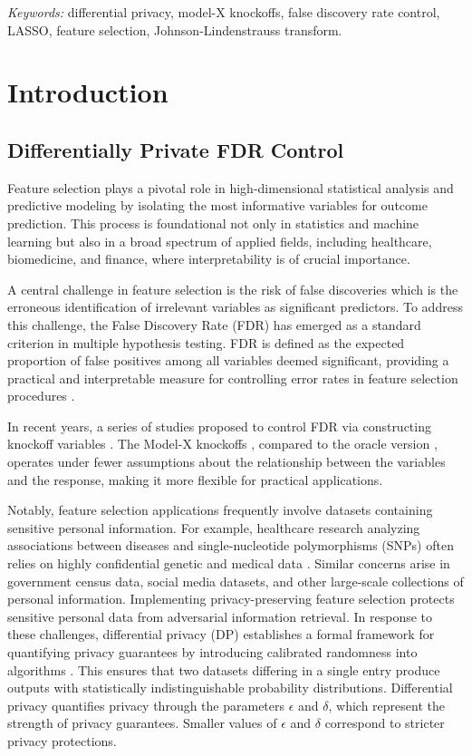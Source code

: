 \documentclass[11pt]{article}
\begin{document}
\noindent \emph{Keywords:} differential privacy, model-X knockoffs, false discovery rate control, LASSO, feature selection, Johnson-Lindenstrauss transform. 


\section{Introduction}
\subsection{Differentially Private FDR Control}
Feature selection plays a pivotal role in high-dimensional statistical analysis and predictive modeling by isolating the most informative variables for outcome prediction. This process is foundational not only in statistics and machine learning but also in a broad spectrum of applied fields, including healthcare, biomedicine, and finance, where interpretability is of crucial importance.

A central challenge in feature selection is the risk of false discoveries which is the erroneous identification of irrelevant variables as significant predictors. To address this challenge, the False Discovery Rate (FDR) has emerged as a standard criterion in multiple hypothesis testing. FDR is defined as the expected proportion of false positives among all variables deemed significant, providing a practical and interpretable measure for controlling error rates in feature selection procedures \citep{Benjamini1995Controlling}. 

In recent years, a series of studies proposed to control FDR via constructing knockoff variables \citep{Barber_2015,candes2017panning,barber2018knockoff}. The Model-X knockoffs \citep{candes2017panning}, compared to the oracle version \citep{Barber_2015}, operates under fewer assumptions about the relationship between the variables and the response, making it more flexible for practical applications.

Notably, feature selection applications frequently involve datasets containing sensitive personal information. For example, healthcare research analyzing associations between diseases and single-nucleotide polymorphisms (SNPs) often relies on highly confidential genetic and medical data \citep{WTCCC}. Similar concerns arise in government census data, social media datasets, and other large-scale collections of personal information. Implementing privacy-preserving feature selection protects sensitive personal data from adversarial information retrieval. In response to these challenges, differential privacy (DP) establishes a formal framework for quantifying privacy guarantees by introducing calibrated randomness into algorithms \citep{DworkMcSherryNissimSmith}. This ensures that two datasets differing in a single entry produce outputs with statistically indistinguishable probability distributions. Differential privacy quantifies privacy through the parameters $\epsilon$ and $\delta$, which represent the strength of privacy guarantees. Smaller values of $\epsilon$ and $\delta$ correspond to stricter privacy protections. 
\end{document}
